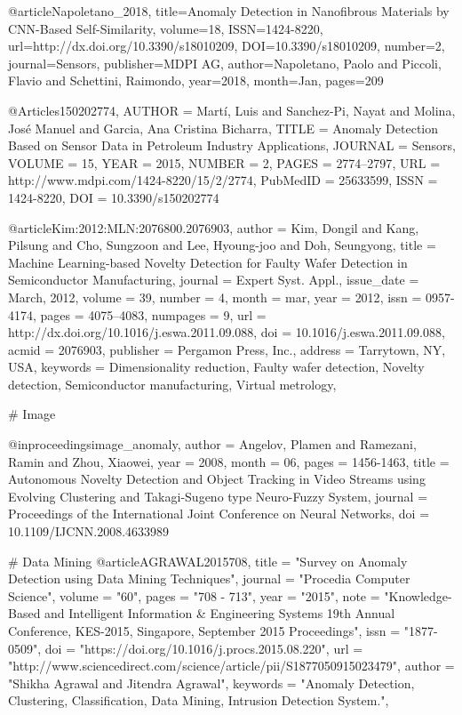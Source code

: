 @article{Napoletano_2018, title={Anomaly Detection in Nanofibrous Materials by CNN-Based Self-Similarity}, volume={18}, ISSN={1424-8220}, url={http://dx.doi.org/10.3390/s18010209}, DOI={10.3390/s18010209}, number={2}, journal={Sensors}, publisher={MDPI AG}, author={Napoletano, Paolo and Piccoli, Flavio and Schettini, Raimondo}, year={2018}, month={Jan}, pages={209}}

@Article{s150202774,
AUTHOR = {Martí, Luis and Sanchez-Pi, Nayat and Molina, José Manuel and Garcia, Ana Cristina Bicharra},
TITLE = {Anomaly Detection Based on Sensor Data in Petroleum Industry Applications},
JOURNAL = {Sensors},
VOLUME = {15},
YEAR = {2015},
NUMBER = {2},
PAGES = {2774--2797},
URL = {http://www.mdpi.com/1424-8220/15/2/2774},
PubMedID = {25633599},
ISSN = {1424-8220},
DOI = {10.3390/s150202774}
}

@article{Kim:2012:MLN:2076800.2076903,
 author = {Kim, Dongil and Kang, Pilsung and Cho, Sungzoon and Lee, Hyoung-joo and Doh, Seungyong},
 title = {Machine Learning-based Novelty Detection for Faulty Wafer Detection in Semiconductor Manufacturing},
 journal = {Expert Syst. Appl.},
 issue_date = {March, 2012},
 volume = {39},
 number = {4},
 month = mar,
 year = {2012},
 issn = {0957-4174},
 pages = {4075--4083},
 numpages = {9},
 url = {http://dx.doi.org/10.1016/j.eswa.2011.09.088},
 doi = {10.1016/j.eswa.2011.09.088},
 acmid = {2076903},
 publisher = {Pergamon Press, Inc.},
 address = {Tarrytown, NY, USA},
 keywords = {Dimensionality reduction, Faulty wafer detection, Novelty detection, Semiconductor manufacturing, Virtual metrology},
} 

# Image

@inproceedings{image_anomaly,
author = {Angelov, Plamen and Ramezani, Ramin and Zhou, Xiaowei},
year = {2008},
month = {06},
pages = {1456-1463},
title = {Autonomous Novelty Detection and Object Tracking in Video Streams using Evolving Clustering and Takagi-Sugeno type Neuro-Fuzzy System},
journal = {Proceedings of the International Joint Conference on Neural Networks},
doi = {10.1109/IJCNN.2008.4633989}
}


# Data Mining
@article{AGRAWAL2015708,
title = "Survey on Anomaly Detection using Data Mining Techniques",
journal = "Procedia Computer Science",
volume = "60",
pages = "708 - 713",
year = "2015",
note = "Knowledge-Based and Intelligent Information & Engineering Systems 19th Annual Conference, KES-2015, Singapore, September 2015 Proceedings",
issn = "1877-0509",
doi = "https://doi.org/10.1016/j.procs.2015.08.220",
url = "http://www.sciencedirect.com/science/article/pii/S1877050915023479",
author = "Shikha Agrawal and Jitendra Agrawal",
keywords = "Anomaly Detection, Clustering, Classification, Data Mining, Intrusion Detection System.",
}

